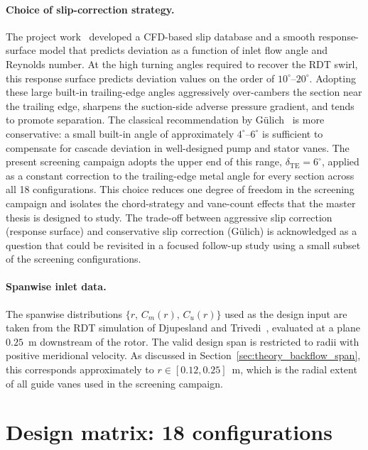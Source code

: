 \paragraph{Choice of slip-correction strategy.}
The project work~\cite{Leonsen2025} developed a CFD-based slip database and a smooth response-surface model that predicts deviation as a function of inlet flow angle and Reynolds number. At the high turning angles required to recover the RDT swirl, this response surface predicts deviation values on the order of $10^\circ$--$20^\circ$. Adopting these large built-in trailing-edge angles aggressively over-cambers the section near the trailing edge, sharpens the suction-side adverse pressure gradient, and tends to promote separation. The classical recommendation by G\"ulich~\cite{Gulich2010} is more conservative: a small built-in angle of approximately $4^\circ$--$6^\circ$ is sufficient to compensate for cascade deviation in well-designed pump and stator vanes. The present screening campaign adopts the upper end of this range, $\delta_{\mathrm{TE}} = 6^\circ$, applied as a constant correction to the trailing-edge metal angle for every section across all 18 configurations. This choice reduces one degree of freedom in the screening campaign and isolates the chord-strategy and vane-count effects that the master thesis is designed to study. The trade-off between aggressive slip correction (response surface) and conservative slip correction (G\"ulich) is acknowledged as a question that could be revisited in a focused follow-up study using a small subset of the screening configurations.
 
\paragraph{Spanwise inlet data.}
The spanwise distributions $\{r,\,C_m(r),\,C_u(r)\}$ used as the design input are taken from the RDT simulation of Djupesland and Trivedi~\cite{DjupeslandTrivedi2025}, evaluated at a plane $0.25$~m downstream of the rotor. The valid design span is restricted to radii with positive meridional velocity. As discussed in Section~\ref{sec:theory_backflow_span}, this corresponds approximately to $r \in [0.12, 0.25]$~m, which is the radial extent of all guide vanes used in the screening campaign.
 
\section{Design matrix: 18 configurations}
\label{sec:methods_design_matrix}
 
